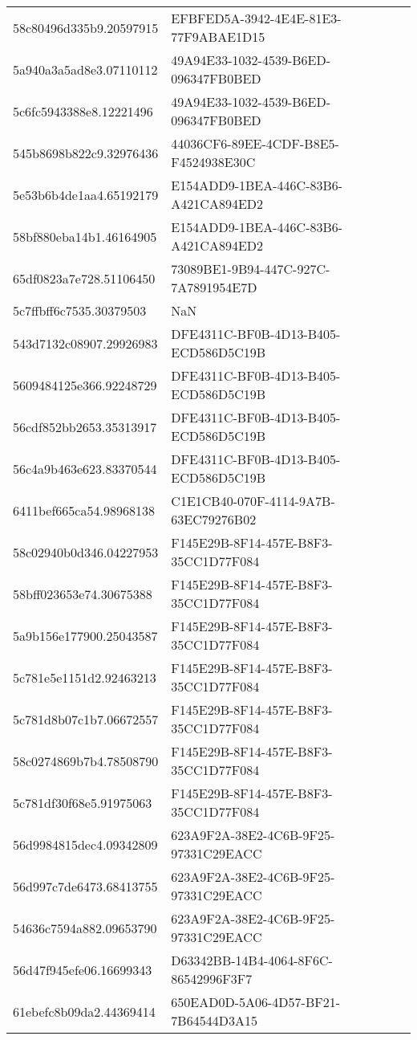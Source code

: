\begin{tabular}{ll}
58c80496d335b9.20597915 & EFBFED5A-3942-4E4E-81E3-77F9ABAE1D15 \\
5a940a3a5ad8e3.07110112 & 49A94E33-1032-4539-B6ED-096347FB0BED \\
5c6fc5943388e8.12221496 & 49A94E33-1032-4539-B6ED-096347FB0BED \\
545b8698b822c9.32976436 & 44036CF6-89EE-4CDF-B8E5-F4524938E30C \\
5e53b6b4de1aa4.65192179 & E154ADD9-1BEA-446C-83B6-A421CA894ED2 \\
58bf880eba14b1.46164905 & E154ADD9-1BEA-446C-83B6-A421CA894ED2 \\
65df0823a7e728.51106450 & 73089BE1-9B94-447C-927C-7A7891954E7D \\
5c7ffbff6c7535.30379503 & NaN \\
543d7132c08907.29926983 & DFE4311C-BF0B-4D13-B405-ECD586D5C19B \\
5609484125e366.92248729 & DFE4311C-BF0B-4D13-B405-ECD586D5C19B \\
56cdf852bb2653.35313917 & DFE4311C-BF0B-4D13-B405-ECD586D5C19B \\
56c4a9b463e623.83370544 & DFE4311C-BF0B-4D13-B405-ECD586D5C19B \\
6411bef665ca54.98968138 & C1E1CB40-070F-4114-9A7B-63EC79276B02 \\
58c02940b0d346.04227953 & F145E29B-8F14-457E-B8F3-35CC1D77F084 \\
58bff023653e74.30675388 & F145E29B-8F14-457E-B8F3-35CC1D77F084 \\
5a9b156e177900.25043587 & F145E29B-8F14-457E-B8F3-35CC1D77F084 \\
5c781e5e1151d2.92463213 & F145E29B-8F14-457E-B8F3-35CC1D77F084 \\
5c781d8b07c1b7.06672557 & F145E29B-8F14-457E-B8F3-35CC1D77F084 \\
58c0274869b7b4.78508790 & F145E29B-8F14-457E-B8F3-35CC1D77F084 \\
5c781df30f68e5.91975063 & F145E29B-8F14-457E-B8F3-35CC1D77F084 \\
56d9984815dec4.09342809 & 623A9F2A-38E2-4C6B-9F25-97331C29EACC \\
56d997c7de6473.68413755 & 623A9F2A-38E2-4C6B-9F25-97331C29EACC \\
54636c7594a882.09653790 & 623A9F2A-38E2-4C6B-9F25-97331C29EACC \\
56d47f945efe06.16699343 & D63342BB-14B4-4064-8F6C-86542996F3F7 \\
61ebefc8b09da2.44369414 & 650EAD0D-5A06-4D57-BF21-7B64544D3A15 \\

\end{tabular}
